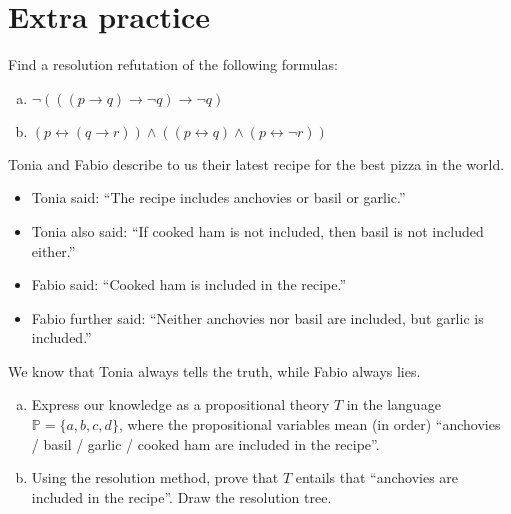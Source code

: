         
\section*{Extra practice}
        

\begin{problem}
    
    Find a resolution refutation of the following formulas:
    \begin{enumerate}[(a)]
        \item $\neg(((p\to q)\to \neg q)\to \neg q)$
        \item $(p\leftrightarrow (q\to r))\wedge((p\leftrightarrow q)\wedge(p\leftrightarrow \neg r))$        
    \end{enumerate}
\end{problem}


\begin{problem}

    Tonia and Fabio describe to us their latest recipe for the best pizza in the world.
    \begin{itemize}
        \item Tonia said: ``The recipe includes anchovies or basil or garlic.''
        \item Tonia also said: ``If cooked ham is not included, then basil is not included either.''
        \item Fabio said: ``Cooked ham is included in the recipe.'' 
        \item Fabio further said: ``Neither anchovies nor basil are included, but garlic is included.''
    \end{itemize}
    We know that Tonia always tells the truth, while Fabio always lies.

    \begin{enumerate}[(a)]
        \item Express our knowledge as a propositional theory $T$ in the language $\mathbb P=\{a,b,c,d\}$, where the propositional variables mean (in order) ``anchovies / basil / garlic / cooked ham are included in the recipe''.
        \item Using the resolution method, prove that $T$ entails that ``anchovies are included in the recipe''. Draw the resolution tree.
    \end{enumerate}

\end{problem}


